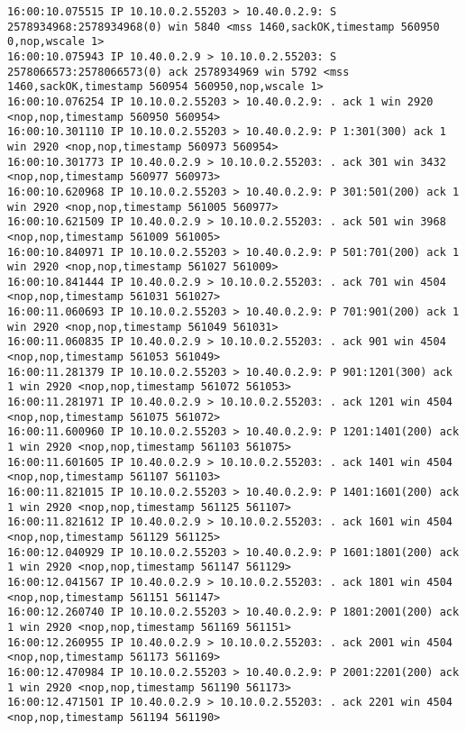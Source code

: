 \documentclass[a4paper,12pt]{article}
\begin{document}
\begin{Verbatim}
16:00:10.075515 IP 10.10.0.2.55203 > 10.40.0.2.9: S 2578934968:2578934968(0) win 5840 <mss 1460,sackOK,timestamp 560950 0,nop,wscale 1>
16:00:10.075943 IP 10.40.0.2.9 > 10.10.0.2.55203: S 2578066573:2578066573(0) ack 2578934969 win 5792 <mss 1460,sackOK,timestamp 560954 560950,nop,wscale 1>
16:00:10.076254 IP 10.10.0.2.55203 > 10.40.0.2.9: . ack 1 win 2920 <nop,nop,timestamp 560950 560954>
16:00:10.301110 IP 10.10.0.2.55203 > 10.40.0.2.9: P 1:301(300) ack 1 win 2920 <nop,nop,timestamp 560973 560954>
16:00:10.301773 IP 10.40.0.2.9 > 10.10.0.2.55203: . ack 301 win 3432 <nop,nop,timestamp 560977 560973>
16:00:10.620968 IP 10.10.0.2.55203 > 10.40.0.2.9: P 301:501(200) ack 1 win 2920 <nop,nop,timestamp 561005 560977>
16:00:10.621509 IP 10.40.0.2.9 > 10.10.0.2.55203: . ack 501 win 3968 <nop,nop,timestamp 561009 561005>
16:00:10.840971 IP 10.10.0.2.55203 > 10.40.0.2.9: P 501:701(200) ack 1 win 2920 <nop,nop,timestamp 561027 561009>
16:00:10.841444 IP 10.40.0.2.9 > 10.10.0.2.55203: . ack 701 win 4504 <nop,nop,timestamp 561031 561027>
16:00:11.060693 IP 10.10.0.2.55203 > 10.40.0.2.9: P 701:901(200) ack 1 win 2920 <nop,nop,timestamp 561049 561031>
16:00:11.060835 IP 10.40.0.2.9 > 10.10.0.2.55203: . ack 901 win 4504 <nop,nop,timestamp 561053 561049>
16:00:11.281379 IP 10.10.0.2.55203 > 10.40.0.2.9: P 901:1201(300) ack 1 win 2920 <nop,nop,timestamp 561072 561053>
16:00:11.281971 IP 10.40.0.2.9 > 10.10.0.2.55203: . ack 1201 win 4504 <nop,nop,timestamp 561075 561072>
16:00:11.600960 IP 10.10.0.2.55203 > 10.40.0.2.9: P 1201:1401(200) ack 1 win 2920 <nop,nop,timestamp 561103 561075>
16:00:11.601605 IP 10.40.0.2.9 > 10.10.0.2.55203: . ack 1401 win 4504 <nop,nop,timestamp 561107 561103>
16:00:11.821015 IP 10.10.0.2.55203 > 10.40.0.2.9: P 1401:1601(200) ack 1 win 2920 <nop,nop,timestamp 561125 561107>
16:00:11.821612 IP 10.40.0.2.9 > 10.10.0.2.55203: . ack 1601 win 4504 <nop,nop,timestamp 561129 561125>
16:00:12.040929 IP 10.10.0.2.55203 > 10.40.0.2.9: P 1601:1801(200) ack 1 win 2920 <nop,nop,timestamp 561147 561129>
16:00:12.041567 IP 10.40.0.2.9 > 10.10.0.2.55203: . ack 1801 win 4504 <nop,nop,timestamp 561151 561147>
16:00:12.260740 IP 10.10.0.2.55203 > 10.40.0.2.9: P 1801:2001(200) ack 1 win 2920 <nop,nop,timestamp 561169 561151>
16:00:12.260955 IP 10.40.0.2.9 > 10.10.0.2.55203: . ack 2001 win 4504 <nop,nop,timestamp 561173 561169>
16:00:12.470984 IP 10.10.0.2.55203 > 10.40.0.2.9: P 2001:2201(200) ack 1 win 2920 <nop,nop,timestamp 561190 561173>
16:00:12.471501 IP 10.40.0.2.9 > 10.10.0.2.55203: . ack 2201 win 4504 <nop,nop,timestamp 561194 561190>

\end{Verbatim}
\end{document}
